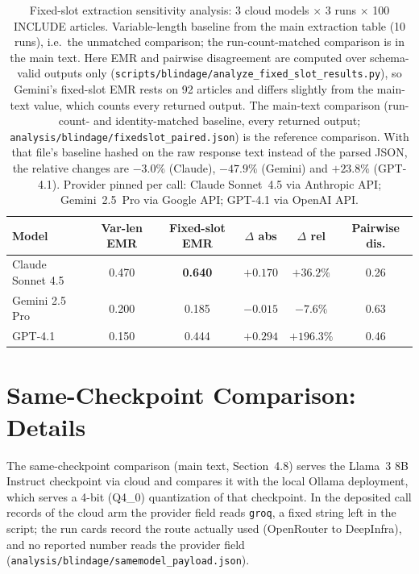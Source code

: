 \documentclass[11pt]{article}
\newenvironment{fittab}{\begin{lrbox}{\fittabbox}}{\end{lrbox}%
  \ifdim\wd\fittabbox>\linewidth\resizebox{\linewidth}{!}{\usebox{\fittabbox}}\else\usebox{\fittabbox}\fi}
\begin{document}
\begin{table}[htbp]
\centering
\caption{Fixed-slot extraction sensitivity analysis: 3 cloud models $\times$ 3 runs $\times$ 100 INCLUDE articles. Variable-length baseline from the main extraction table (10 runs), i.e.\ the unmatched comparison; the run-count-matched comparison is in the main text. Here EMR and pairwise disagreement are computed over schema-valid outputs only (\texttt{scripts/blindage/analyze\_fixed\_slot\_results.py}), so Gemini's fixed-slot EMR rests on 92 articles and differs slightly from the main-text value, which counts every returned output. The main-text comparison (run-count- and identity-matched baseline, every returned output; \texttt{analysis/blindage/fixedslot\_paired.json}) is the reference comparison. With that file's baseline hashed on the raw response text instead of the parsed JSON, the relative changes are $-3.0\%$ (Claude), $-47.9\%$ (Gemini) and $+23.8\%$ (GPT-4.1). Provider pinned per call: Claude Sonnet~4.5 via Anthropic API; Gemini~2.5~Pro via Google API; GPT-4.1 via OpenAI API.}
\label{tab:fixedslot_supp}
\begin{fittab}\begin{tabular}{lccccc}
\toprule
\textbf{Model} & \textbf{Var-len EMR} & \textbf{Fixed-slot EMR} & \textbf{$\Delta$ abs} & \textbf{$\Delta$ rel} & \textbf{Pairwise dis.} \\
\midrule
Claude Sonnet 4.5 & 0.470 & \textbf{0.640} & $+0.170$ & $+36.2\%$ & 0.26 \\
Gemini 2.5 Pro    & 0.200 & 0.185 & $-0.015$ & $-7.6\%$  & 0.63 \\
GPT-4.1           & 0.150 & 0.444 & \textbf{$+0.294$} & \textbf{$+196.3\%$} & 0.46 \\
\bottomrule
\end{tabular}\end{fittab}
\end{table}

\section{Same-Checkpoint Comparison: Details}
\label{sec:desconfound_supp}

The same-checkpoint comparison (main text, Section~4.8) serves the Llama~3 8B Instruct checkpoint via cloud and compares it with the local Ollama deployment, which serves a 4-bit (Q4\_0) quantization of that checkpoint. In the deposited call records of the cloud arm the provider field reads \texttt{groq}, a fixed string left in the script; the run cards record the route actually used (OpenRouter to DeepInfra), and no reported number reads the provider field (\texttt{analysis/blindage/samemodel\_payload.json}).
\end{document}
